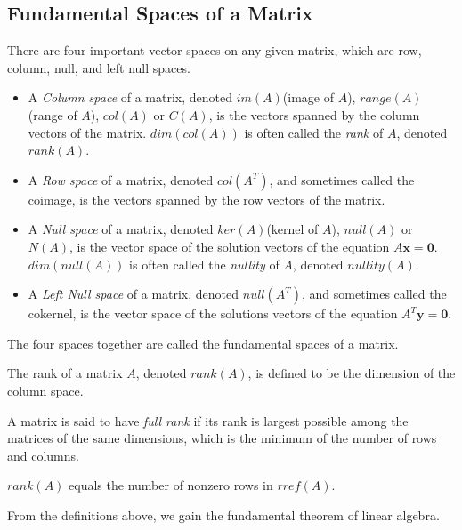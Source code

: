 \documentclass{report}
\begin{document}
	\subsection{Fundamental Spaces of a Matrix}
	There are four important vector spaces on any given matrix, which are row, column, null, and left null spaces.
	\begin{defn}
		\begin{itemize}
			\item A \emph{Column space} of a matrix, denoted $im(A)$(image of $A$), $range(A)$(range of $A$), $col(A)$ or $C(A)$, is the vectors spanned by the column vectors of the matrix. $dim(col(A))$ is often called the \emph{rank} of $A$, denoted $rank(A)$.
			\item A \emph{Row space} of a matrix, denoted $col(A^T)$, and sometimes called the coimage, is the vectors spanned by the row vectors of the matrix.
			\item A \emph{Null space} of a matrix, denoted $ker(A)$(kernel of $A$), $null(A)$ or $N(A)$, is the vector space of the solution vectors of the equation $A\bm{x}=\bm{0}$. $dim(null(A))$ is often called the \emph{nullity} of $A$, denoted $nullity(A)$.
			\item A \emph{Left Null space} of a matrix, denoted $null(A^T)$, and sometimes called the cokernel, is the vector space of the solutions vectors of the equation $A^T\bm{y}=\bm{0}$.
		\end{itemize}
		The four spaces together are called the fundamental spaces of a matrix.
	\end{defn}
	
	\begin{defn}
		The rank of a matrix $A$, denoted $rank(A)$, is defined to be the dimension of the column space.
	\end{defn}
	
	\begin{defn}
		A matrix is said to have \emph{full rank} if its rank is largest possible among the matrices of the same dimensions, which is the minimum of the number of rows and columns.
	\end{defn}
	
	\begin{thm}
		$rank(A)$ equals the number of nonzero rows in $rref(A)$.
	\end{thm}
	
	From the definitions above, we gain the fundamental theorem of linear algebra.
	
\end{document}

